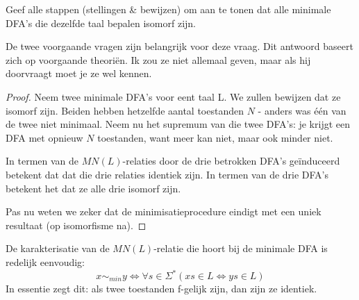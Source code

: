 \begin{quest}[Vraag 7]
  Geef alle stappen (stellingen \& bewijzen) om aan te tonen dat alle minimale DFA's die dezelfde taal bepalen isomorf zijn.
\end{quest}

De twee voorgaande vragen zijn belangrijk voor deze vraag. Dit antwoord baseert zich op voorgaande theori\"en. Ik zou ze niet allemaal geven, maar als hij doorvraagt moet je ze wel kennen.

\begin{proof}

  Neem twee minimale DFA's voor eent taal L. We zullen bewijzen dat ze isomorf zijn. Beiden hebben hetzelfde aantal toestanden $N$ - anders was \'e\'en van de twee niet minimaal. Neem nu het supremum van die twee DFA's: je krijgt een DFA met opnieuw $N$ toestanden, want meer kan niet, maar ook minder niet.

  In termen van de $MN(L)$-relaties door de drie betrokken DFA's ge\"induceerd betekent dat dat die drie relaties identiek zijn. In termen van de drie DFA's betekent het dat ze alle drie isomorf zijn.

  Pas nu weten we zeker dat de minimisatieprocedure eindigt met een uniek resultaat (op isomorfisme na).
\end{proof}

De karakterisatie van de $MN(L)$-relatie die hoort bij de minimale DFA is redelijk eenvoudig:
$$x \sim_{min} y \iff \forall s \in \Sigma^*(xs \in L \iff ys \in L)$$
In essentie zegt dit: als twee toestanden f-gelijk zijn, dan zijn ze identiek.
